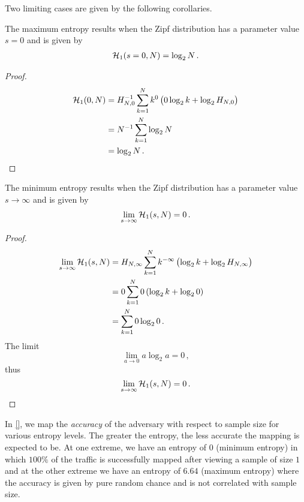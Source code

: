 \documentclass[ ../main.tex]{subfiles}
\newcommand{\harmonic}[2]{H_{#1,#2}}
\begin{document}
Two limiting cases are given by the following corollaries.
\begin{corollary}
The maximum entropy results when the Zipf distribution has a parameter value $s=0$ and is given by
\begin{align}
    \operatorname{\mathcal{H}}_1(s = 0,N) = \log_2 N\,.
\end{align}
\end{corollary}
\begin{proof}
\begin{align}
    \entropy_1(0,N)
        &= \harmonic{N}{0}^{-1} \sum_{k=1}^{N} k^{0}
        \left(0 \log_2 k + \log_2 \harmonic{N}{0}\right)\\
        &= N^{-1} \sum_{k=1}^{N} \log_2 N\\
        &= \log_2 N\,.
\end{align}
\end{proof}

\begin{corollary}
The minimum entropy results when the Zipf distribution has a parameter value $s \to \infty$ and is given by
\begin{align}
    \lim_{s \to \infty} \operatorname{\mathcal{H}}_1(s,N) = 0\,.
\end{align}
\end{corollary}
\begin{proof}
\begin{align}
    \lim_{s \to \infty} \entropy_1(s,N)
        &= \harmonic{N}{\infty} \sum_{k=1}^{N} k^{-\infty}
        \left(\log_2 k + \log_2 \harmonic{N}{\infty}\right)\\
        &= 0 \sum_{k=1}^{N} 0
        \left(\log_2 k + \log_2 0\right)\\
        &= \sum_{k=1}^{N} 0 \log_2 0\,.
\end{align}
The limit
\begin{equation}
    \lim_{a \to 0} a \log_2 a = 0\,,
\end{equation}
thus
\begin{equation}
    \lim_{s \to \infty} \operatorname{\mathcal{H}}_1(s,N) = 0\,.
\end{equation}
\end{proof}

In \cref{}, we map the \emph{accuracy} of the adversary with respect to sample size for various entropy levels. The greater the entropy, the less accurate the mapping is expected to be. At one extreme, we have an entropy of $0$ (minimum entropy) in which $100\%$ of the traffic is successfully mapped after viewing a sample of size $1$ and at the other extreme we have an entropy of $6.64$ (maximum entropy) where the accuracy is given by pure random chance and is not correlated with sample size.
\end{document}
